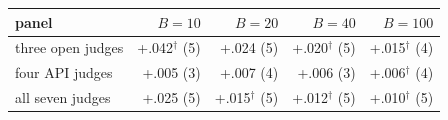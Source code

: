 \begin{tabular}{@{}lrrrr@{}}
\toprule
panel & $B=10$ & $B=20$ & $B=40$ & $B=100$ \\
\midrule
three open judges & +.042$^{\dagger}$ (5) & +.024 (5) & +.020$^{\dagger}$ (5) & +.015$^{\dagger}$ (4) \\
four API judges & +.005 (3) & +.007 (4) & +.006 (3) & +.006$^{\dagger}$ (4) \\
all seven judges & +.025 (5) & +.015$^{\dagger}$ (5) & +.012$^{\dagger}$ (5) & +.010$^{\dagger}$ (5) \\
\bottomrule
\end{tabular}
